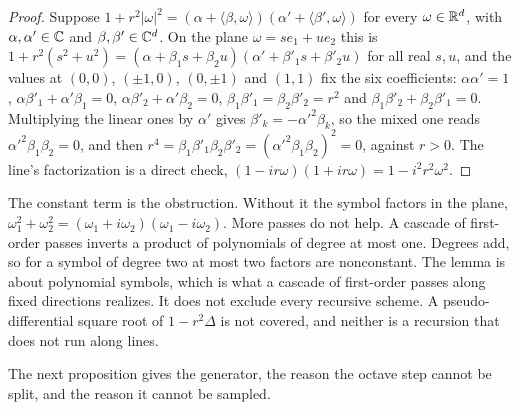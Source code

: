 \begin{proof}
\leanok
Suppose $1 + r^2|\omega|^2 = (\alpha + \langle\beta,\omega\rangle)(\alpha' + \langle\beta',\omega\rangle)$
for every $\omega \in \mathbb{R}^d$, with $\alpha,\alpha' \in \mathbb{C}$ and $\beta,\beta' \in \mathbb{C}^d$. On the plane
$\omega = se_1 + ue_2$ this is
$1 + r^2(s^2 + u^2) = (\alpha + \beta_1s + \beta_2u)(\alpha' + \beta'_1s + \beta'_2u)$ for all real
$s, u$, and the values at $(0,0)$, $(\pm1,0)$, $(0,\pm1)$ and $(1,1)$ fix the six coefficients:
$\alpha\alpha' = 1$, $\alpha\beta'_1 + \alpha'\beta_1 = 0$, $\alpha\beta'_2 + \alpha'\beta_2 = 0$,
$\beta_1\beta'_1 = \beta_2\beta'_2 = r^2$ and $\beta_1\beta'_2 + \beta_2\beta'_1 = 0$. Multiplying the
linear ones by $\alpha'$ gives $\beta'_k = -\alpha'^2\beta_k$, so the mixed one reads
$\alpha'^2\beta_1\beta_2 = 0$, and then
$r^4 = \beta_1\beta'_1\beta_2\beta'_2 = (\alpha'^2\beta_1\beta_2)^2 = 0$, against $r > 0$. The line's
factorization is a direct check, $(1 - ir\omega)(1 + ir\omega) = 1 - i^2r^2\omega^2$.
\end{proof}

The constant term is the obstruction. Without it the symbol factors in the plane,
$\omega_1^2 + \omega_2^2 = (\omega_1 + i\omega_2)(\omega_1 - i\omega_2)$. More passes do not help. A
cascade of first-order passes inverts a product of polynomials of degree at most one. Degrees add,
so for a symbol of degree two at most two factors are nonconstant. The lemma is about polynomial
symbols, which is what a cascade of first-order passes along fixed directions realizes. It does not
exclude every recursive scheme. A pseudo-differential square root of $1 - r^2\Delta$ is not covered,
and neither is a recursion that does not run along lines.

The next proposition gives the generator, the reason the octave step cannot be split, and the
reason it cannot be sampled.

